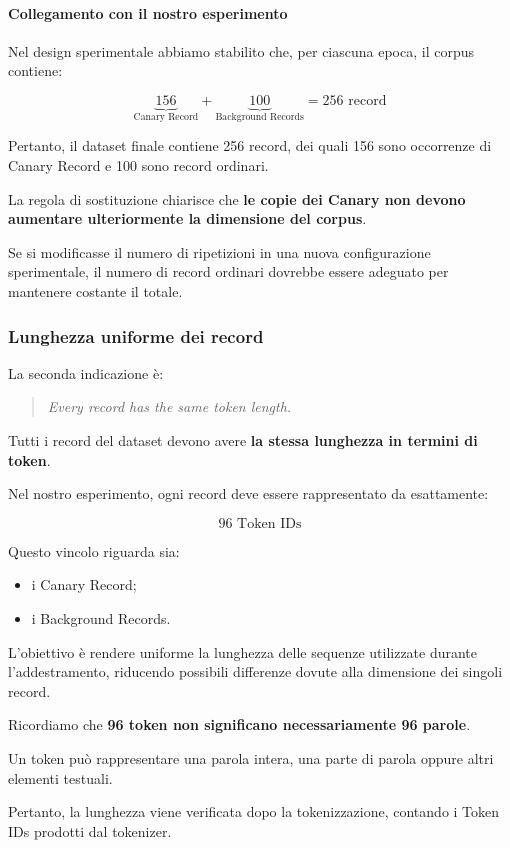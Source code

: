 \paragraph{Collegamento con il nostro esperimento}

Nel design sperimentale abbiamo stabilito che,
per ciascuna epoca, il corpus contiene:

\[
\underbrace{156}_{\text{Canary Record}}
+
\underbrace{100}_{\text{Background Records}}
=
\boxed{256 \text{ record}}
\]

Pertanto, il dataset finale contiene 256 record,
dei quali 156 sono occorrenze di Canary Record
e 100 sono record ordinari.

La regola di sostituzione chiarisce che
\textbf{le copie dei Canary non devono aumentare
ulteriormente la dimensione del corpus}.

Se si modificasse il numero di ripetizioni
in una nuova configurazione sperimentale,
il numero di record ordinari dovrebbe essere
adeguato per mantenere costante il totale.

\subsubsection{Lunghezza uniforme dei record}

La seconda indicazione è:

\begin{quote}
    \textit{Every record has the same token length.}
\end{quote}

Tutti i record del dataset devono avere
\textbf{la stessa lunghezza in termini di token}.

Nel nostro esperimento, ogni record deve
essere rappresentato da esattamente:

\[
\boxed{96 \text{ Token IDs}}
\]

Questo vincolo riguarda sia:
\begin{itemize}
    \item i Canary Record;
    \item i Background Records.
\end{itemize}

L'obiettivo è rendere uniforme la lunghezza
delle sequenze utilizzate durante l'addestramento,
riducendo possibili differenze dovute
alla dimensione dei singoli record.

\begin{observation}
    Ricordiamo che \textbf{96 token non
    significano necessariamente 96 parole}.

    Un token può rappresentare una parola intera,
    una parte di parola oppure altri elementi
    testuali.

    Pertanto, la lunghezza viene verificata
    dopo la tokenizzazione, contando
    i Token IDs prodotti dal tokenizer.
\end{observation}

